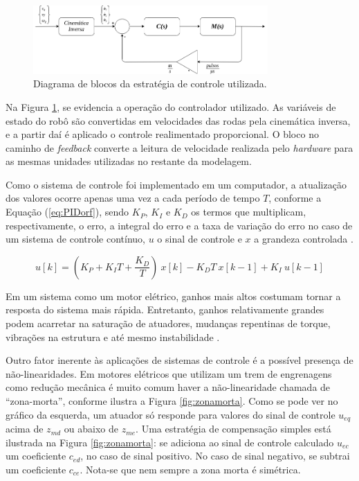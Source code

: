 \begin{figure}[h]
  \centering
  \includegraphics[width = 0.8\textwidth]{imagens/controle}
  \caption{Diagrama de blocos da estratégia de controle utilizada.}
  \label{fig:controle}
\end{figure}

Na Figura \ref{fig:controle}, se evidencia a operação do controlador utilizado. As variáveis de estado do robô são convertidas em velocidades das rodas pela cinemática inversa, e a partir daí é aplicado o controle realimentado proporcional. O bloco no caminho de \textit{feedback} converte a leitura de velocidade realizada pelo \textit{hardware} para as mesmas unidades utilizadas no restante da modelagem.

Como o sistema de controle foi implementado em um computador, a atualização dos valores ocorre apenas uma vez a cada período de tempo $T$, conforme a Equação (\ref{eq:PIDorf}), sendo $K_P$, $K_I$ e $K_D$ os termos que multiplicam, respectivamente, o erro, a integral do erro e a taxa de variação do erro no caso de um sistema de controle contínuo, $u$ o sinal de controle e $x$ a grandeza controlada \citep{dorf2008modern}.

\begin{equation}
  u[k] = (K_P+K_I T+\frac{K_D}{T})\ x[k] - K_D T\ x[k-1] + K_I\ u[k-1]
  \label{eq:PIDorf}
\end{equation}

Em um sistema como um motor elétrico, ganhos mais altos costumam tornar a resposta do sistema mais rá\acrshort{pid}a. Entretanto, ganhos relativamente grandes podem acarretar na saturação de atuadores, mudanças repentinas de torque, vibrações na estrutura e até mesmo instabilidade \citep{lynch2017modern}.

Outro fator inerente às aplicações de sistemas de controle é a possível presença de não-linearidades. Em motores elétricos que utilizam um trem de engrenagens como redução mecânica é muito comum haver a não-linearidade chamada de ``zona-morta'', conforme ilustra a Figura \ref{fig:zonamorta}. Como se pode ver no gráfico da esquerda, um atuador só responde para valores do sinal de controle $u_{eq}$ acima de $z_{md}$ ou abaixo de $z_{me}$. Uma estratégia de compensação simples está ilustrada na Figura \ref{fig:zonamorta}: se adiciona ao sinal de controle calculado $u_{ec}$ um coeficiente $c_{ed}$, no caso de sinal positivo. No caso de sinal negativo, se subtrai um coeficiente $c_{ce}$. Nota-se que nem sempre a zona morta é simétrica.

